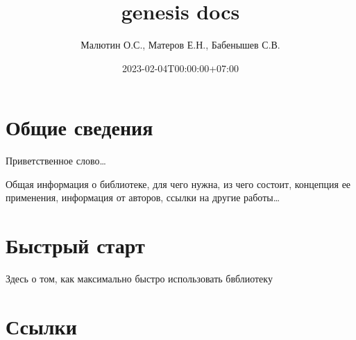 \documentclass[
  letterpaper,
  DIV=11,
  numbers=noendperiod]{scrreprt}
\title{genesis docs}
\author{Малютин О.С., Матеров Е.Н., Бабенышев С.В.}
\date{2023-02-04T00:00:00+07:00}
\newlength{\cslhangindent}
\newlength{\cslentryspacingunit} %
\newenvironment{CSLReferences}[2] %
 {%
  \setlength{\parindent}{0pt}
  \ifodd #1
  \let\oldpar\par
  \def\par{\hangindent=\cslhangindent\oldpar}
  \fi
  \setlength{\parskip}{#2\cslentryspacingunit}
 }%
 {}
\renewcommand*\contentsname{Table of contents}
\newcommand\contentsname{Table of contents}
\begin{document}
\maketitle
\ifdefined\Shaded\renewenvironment{Shaded}{\begin{tcolorbox}[interior hidden, sharp corners, breakable, frame hidden, borderline west={3pt}{0pt}{shadecolor}, boxrule=0pt, enhanced]}{\end{tcolorbox}}\fi

\renewcommand*\contentsname{Table of contents}
{
\hypersetup{linkcolor=}
\setcounter{tocdepth}{2}
\tableofcontents
}

\hypertarget{ux43eux431ux449ux438ux435-ux441ux432ux435ux434ux435ux43dux438ux44f}{%
\chapter*{Общие
сведения}\label{ux43eux431ux449ux438ux435-ux441ux432ux435ux434ux435ux43dux438ux44f}}

Приветственное слово\ldots{}

Общая информация о библиотеке, для чего нужна, из чего состоит,
концепция ее применения, информация от авторов, ссылки на другие
работы\ldots{}


\hypertarget{ux431ux44bux441ux442ux440ux44bux439-ux441ux442ux430ux440ux442}{%
\chapter{Быстрый
старт}\label{ux431ux44bux441ux442ux440ux44bux439-ux441ux442ux430ux440ux442}}

Здесь о том, как максимально быстро использовать бвблиотеку


\hypertarget{ux441ux441ux44bux43bux43aux438}{%
\chapter*{Ссылки}\label{ux441ux441ux44bux43bux43aux438}}

\hypertarget{refs}{}
\begin{CSLReferences}{0}{0}
\end{CSLReferences}
\end{document}
